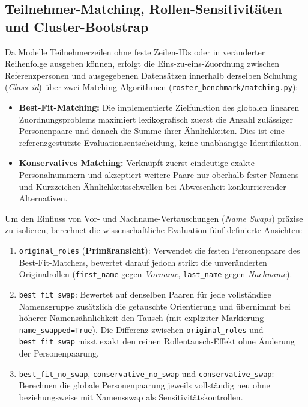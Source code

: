 \subsection{Teilnehmer-Matching, Rollen-Sensitivitäten und Cluster-Bootstrap}
\label{subsec:matching-bootstrap}

Da Modelle Teilnehmerzeilen ohne feste Zeilen-IDs oder in veränderter Reihenfolge ausgeben können, erfolgt die Eins-zu-eins-Zuordnung zwischen Referenzpersonen und ausgegebenen Datensätzen innerhalb derselben Schulung (\emph{Class~\ac{id}}) über zwei Matching-Algorithmen (\texttt{roster\_benchmark/matching.py}):
\begin{itemize}
  \item \textbf{Best-Fit-Matching:} Die implementierte Zielfunktion des globalen linearen Zuordnungsproblems maximiert lexikografisch zuerst die Anzahl zulässiger Personenpaare und danach die Summe ihrer Ähnlichkeiten. Dies ist eine referenzgestützte Evaluationsentscheidung, keine unabhängige Identifikation.
  \item \textbf{Konservatives Matching:} Verknüpft zuerst eindeutige exakte Personalnummern und akzeptiert weitere Paare nur oberhalb fester Namens- und Kurzzeichen-Ähnlichkeitsschwellen bei Abwesenheit konkurrierender Alternativen.
\end{itemize}
Um den Einfluss von Vor- und Nachname-Vertauschungen (\emph{Name Swaps}) präzise zu isolieren, berechnet die wissenschaftliche Evaluation fünf definierte Ansichten:
\begin{enumerate}
  \item \texttt{original\_roles} (\textbf{Primäransicht}): Verwendet die festen Personenpaare des Best-Fit-Matchers, bewertet darauf jedoch strikt die unveränderten Originalrollen (\texttt{first\_name} gegen \emph{Vorname}, \texttt{last\_name} gegen \emph{Nachname}).
  \item \texttt{best\_fit\_swap}: Bewertet auf denselben Paaren für jede vollständige Namensgruppe zusätzlich die getauschte Orientierung und übernimmt bei höherer Namensähnlichkeit den Tausch (mit expliziter Markierung \texttt{name\_swapped=True}). Die Differenz zwischen \texttt{original\_roles} und \texttt{best\_fit\_swap} misst exakt den reinen Rollentausch-Effekt ohne Änderung der Personenpaarung.
  \item \texttt{best\_fit\_no\_swap}, \texttt{conservative\_no\_swap} und \texttt{conservative\_swap}: Berechnen die globale Personenpaarung jeweils vollständig neu ohne beziehungsweise mit Namensswap als Sensitivitätskontrollen.
\end{enumerate}

